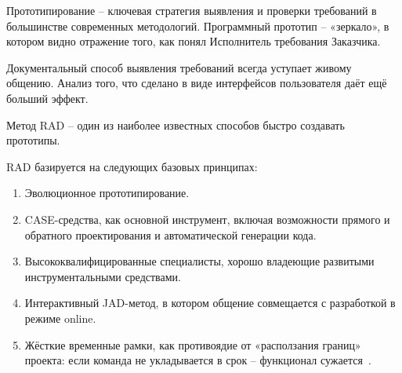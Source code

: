 \documentclass{../industrial-development}
\begin{document}
Прототипирование – ключевая стратегия выявления и проверки требований в большинстве современных методологий. Программный прототип –
«зеркало», в котором видно отражение того, как понял Исполнитель требования Заказчика. 

Документальный способ выявления требований
всегда уступает живому общению. Анализ того, что сделано в виде интерфейсов пользователя даёт ещё больший эффект. 

Метод RAD – один из наиболее известных способов быстро создавать прототипы.

RAD базируется на следующих базовых принципах:
\begin{enumerate}
\item Эволюционное прототипирование.
\item CASE-средства, как основной инструмент, включая возможности прямого и
обратного проектирования и автоматической генерации кода.
\item Высококвалифицированные специалисты, хорошо владеющие развитыми
инструментальными средствами.
\item Интерактивный JAD-метод, в котором общение совмещается с разработкой
в режиме online.
\item Жёсткие временные рамки, как противоядие от «расползания границ» проекта: если команда не укладывается в срок – функционал сужается~\cite[с.~33--34]{Maglinec}.
\end{enumerate}



\end{document}
